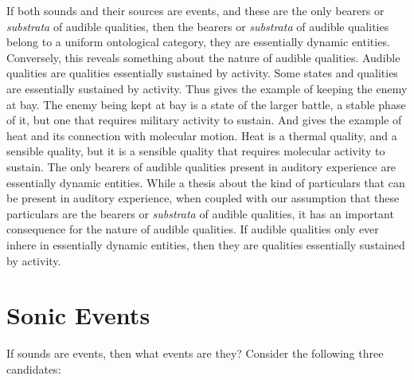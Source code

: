 \documentclass[12pt]{article}
\begin{document}
If both sounds and their sources are events, and these are the only bearers or \emph{substrata} of audible qualities, then the bearers or \emph{substrata} of audible qualities belong to a uniform ontological category, they are essentially dynamic entities. Conversely, this reveals something about the nature of audible qualities. Audible qualities are qualities essentially sustained by activity. Some states and qualities are essentially sustained by activity. Thus \citet{Ryle:1949qr} gives the example of keeping the enemy at bay. The enemy being kept at bay is a state of the larger battle, a stable phase of it, but one that requires military activity to sustain. And \citet{kripke72} gives the example of heat and its connection with molecular motion. Heat is a thermal quality, and a sensible quality, but it is a sensible quality that requires molecular activity to sustain. The only bearers of audible qualities present in auditory experience are essentially dynamic entities. While a thesis about the kind of particulars that can be present in auditory experience, when coupled with our assumption that these particulars are the bearers or \emph{substrata} of audible qualities, it has an important consequence for the nature of audible qualities. If audible qualities only ever inhere in essentially dynamic entities, then they are qualities essentially sustained by activity. 


\section{Sonic Events} %
\label{sec:sonic_events}

If sounds are events, then what events are they? Consider the following three candidates:
\end{document}

